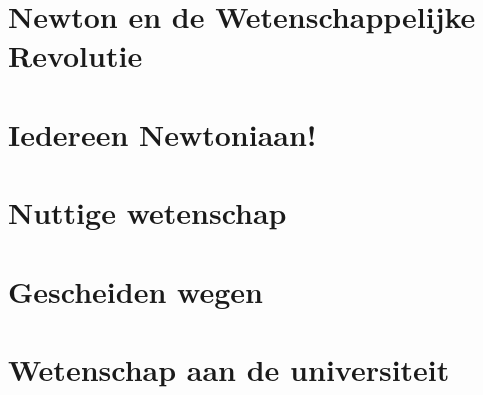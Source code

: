 \documentclass{article}
\begin{document}
  \section{Newton en de Wetenschappelijke Revolutie}

  \newpage
  \section{Iedereen Newtoniaan!}

  \newpage
  \section{Nuttige wetenschap}

  \newpage
  \section{Gescheiden wegen}

  \newpage
  \section{Wetenschap aan de universiteit}
\end{document}
